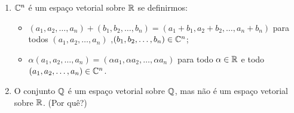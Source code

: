 \begin{exemplo}
\begin{enumerate}[label={\arabic*})]
    \item $\mathbb{C}^n$ \'e um espa\c{c}o vetorial sobre $\mathbb{R}$ se definirmos:
          \begin{itemize}
            \item $(a_1, a_2, \dots, a_n) + (b_1, b_2, \dots,b_n) = (a_1 + b_1, a_2 + b_2,\dots, a_n + b_n)$ para todos $(a_1, a_2, \dots,a_n)$ ,$(b_1, b_2, \dots,b_n) \in \mathbb{C}^n$;
            \item $\alpha (a_1, a_2, \dots,a_n) = (\alpha a_1, \alpha a_2, \dots, \alpha a_n)$ para todo $\alpha \in \mathbb{R}$ e todo $(a_1, a_2, \dots, a_n) \in \mathbb{C}^n$.
          \end{itemize}

    \item O conjunto $\mathbb{Q}$ \'e um espa\c{c}o vetorial sobre $\mathbb{Q}$, mas n\~ao \'e um espa\c{c}o vetorial sobre $\mathbb{R}$. (Por qu\^e?)


\end{enumerate}
\end{exemplo}
